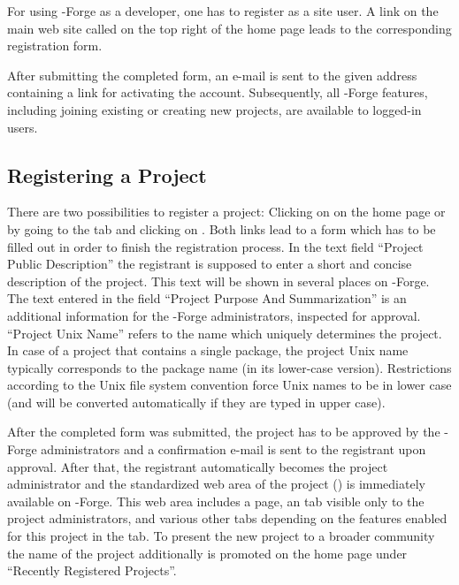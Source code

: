 For using \R{}-Forge as a developer, one has
to register as a site user. A link on the main web site called
 on the top right of the home page leads to the
corresponding registration form.

After submitting the completed form, an e-mail is sent to the given
address containing a link for activating the account. Subsequently,
all \R{}-Forge features, including joining existing or creating
new projects, are available to logged-in users.

\subsection{Registering a Project}

There are two possibilities to register a project: Clicking on
 on the home page or by going to the  tab and clicking on . Both links lead to a
form which has to be filled out in order to finish the registration
process. In the text field ``Project Public Description'' the
registrant is supposed to enter a short and concise description of the
project. This text will be shown in several places on \R{}-Forge. The text
entered in the field ``Project Purpose And Summarization'' is an
additional information for the \R{}-Forge administrators, inspected
for approval. ``Project Unix
Name'' refers to the name which 
uniquely determines the project. In case of a project that contains a
single \R{} package, the project Unix name typically corresponds to
the package name (in its lower-case version). Restrictions according to
the Unix file system convention force Unix names to be in lower case
(and will be converted automatically if they are typed in upper case).

After the completed form was submitted, the project has to be approved
by the \R{}-Forge administrators and a confirmation e-mail is sent to the
registrant upon approval. After that, the registrant automatically
becomes the project administrator and the standardized web area of the
project () is
immediately available on \R{}-Forge. 
This web area includes a  page, an  tab
visible only to the project administrators, and various other tabs
depending on the features enabled for this project in the 
tab. To present the new project to a broader community the name of the
project additionally is promoted on the home page under ``Recently
Registered Projects''.

